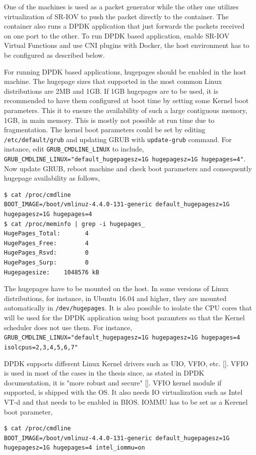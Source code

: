 \documentclass[english, 12pt, a4paper, elec, utf8, a-1b, online]{aaltothesis}
\begin{document}
One of the machines is used as a packet generator while the other one utilizes virtualization of SR-IOV to push the packet directly to the container. The container also runs a DPDK application that just forwards the packets received on one port to the other. To run DPDK based application, enable SR-IOV Virtual Functions and use CNI plugins with Docker, the host environment has to be configured as described below.

For running DPDK based applications, hugepages should be enabled in the host machine. The hugepage sizes that supported in the most common Linux distributions are 2MB and 1GB. If 1GB hugepages are to be used, it is recommended to have them configured at boot time by setting some Kernel boot parameters. This it to ensure the availability of such a large contiguous memory, 1GB, in main memory. This is mostly not possible at run time due to fragmentation. The kernel boot parameters could be set by editing \lstinline{/etc/default/grub} and updating GRUB with \lstinline{update-grub} command. For instance, edit \lstinline{GRUB_CMDLINE_LINUX} to include, \lstinline{GRUB_CMDLINE_LINUX="default_hugepagesz=1G hugepagesz=1G hugepages=4"}. Now update GRUB, reboot machine and check boot parameters and consequently hugepage availability as follows,

\begin{lstlisting}[basicstyle={\small\ttfamily}]
$ cat /proc/cmdline 
BOOT_IMAGE=/boot/vmlinuz-4.4.0-131-generic default_hugepagesz=1G hugepagesz=1G hugepages=4
$ cat /proc/meminfo | grep -i hugepages_
HugePages_Total:       4
HugePages_Free:        4
HugePages_Rsvd:        0
HugePages_Surp:        0
Hugepagesize:    1048576 kB
\end{lstlisting}

The hugepages have to be mounted on the host. In some versions of Linux distributions, for instance, in Ubuntu 16.04 and higher, they are mounted automatically in \lstinline{/dev/hugepages}. It is also possible to isolate the CPU cores that will be used for the DPDK application using boot paramters so that the Kernel scheduler does not use them. For instance, \lstinline{GRUB_CMDLINE_LINUX="default_hugepagesz=1G hugepagesz=1G hugepages=4 isolcpus=2,3,4,5,6,7"}

DPDK supports different Linux Kernel drivers such as UIO, VFIO, etc. []. VFIO is used in most of the cases in the thesis since, as stated in DPDK documentation, it is "more robust and secure" []. VFIO kernel module if supported, is shipped with the OS. It also needs IO virtualization such as Intel VT-d and that needs to be enabled in BIOS. IOMMU has to be set as a Kerenel boot parameter,
\begin{lstlisting}[basicstyle={\small\ttfamily}]
$ cat /proc/cmdline 
BOOT_IMAGE=/boot/vmlinuz-4.4.0-131-generic default_hugepagesz=1G hugepagesz=1G hugepages=4 intel_iommu=on
\end{lstlisting}
\end{document}
